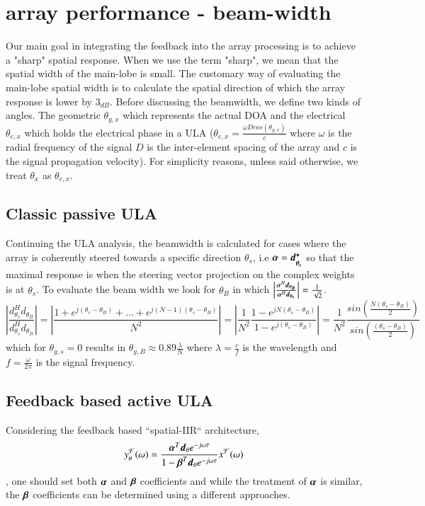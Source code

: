 \chapter{array performance - beam-width}
\label{apdx:arrayPerformance_beamwidth}
Our main goal in integrating the feedback into the array processing is to achieve a "sharp" spatial response. When we use the term "sharp", we mean that the spatial width of the main-lobe is small. The customary way of evaluating the main-lobe spatial width is to calculate the spatial direction of which the array response is lower by $3_{dB}$.
Before discussing the beamwidth, we define two kinds of angles. The geometric $\theta_{g,x}$ which represents the actual DOA and the electrical $\theta_{e,x}$ which holds the electrical phase in a ULA ($\theta_{e,x} = \frac{\omega{Dcos(\theta_{g,x})}}{c}$ where $\omega$ is the radial frequency of the signal $D$ is the inter-element spacing of the array and $c$ is the signal propagation velocity). For simplicity reasons, unless said otherwise, we treat $\theta_{x}$ as $\theta_{e,x}$. 
\section{Classic passive ULA}
Continuing the ULA analysis, the beamwidth is calculated for cases where the array is coherently steered towards a specific direction $\theta_{s}$, i.e $ \boldsymbol{\alpha} = \boldsymbol{d^{*}_{\theta_{s}}}$ so that the maximal response is when the steering vector projection on the complex weights is at $\theta_{s}$.
To evaluate the beam width we look for $\theta_{B}$ in which 
$ \left|\frac{
\boldsymbol{\alpha}^{H}\boldsymbol{d_{\theta_{B}}}
}{
\boldsymbol{\alpha}^{H}\boldsymbol{d_{\theta_{s}}}
}\right| = \frac{1}{\sqrt{2}}$.
$$
\left|\frac{
d^{H}_{\theta_{s}}d_{\theta_{B}}
}{
d^{H}_{\theta_{s}}d_{\theta_{B}}
}\right|
=
\left|
\frac{1+e^{j(\theta_{s}-\theta_{B})}+\hdots+e^{j(N-1)(\theta_{s}-\theta_{B})}
}{
N^2
}
\right|
=
\left|
\frac{1}{N^2}\frac{
1-e^{jN(\theta_{s}-\theta_{B})}
}{
1-e^{j(\theta_{s}-\theta_{B})}
}
\right|
=
\frac{1}{N^{2}}
\frac{
sin\left(\frac{N\left(\theta_{s}-\theta_{B}\right)}{2}\right)
}{
sin\left(\frac{\left(\theta_{s}-\theta_{B}\right)}{2}\right)
}
$$
which for $\theta_{g,s} = 0$ results in $\theta_{g,B} \approx 0.89\frac{\lambda}{N}$ where $\lambda = \frac{c}{f}$ is the wavelength and $f = \frac{\omega}{2\pi}$ is the signal frequency.
\section{Feedback based active ULA}
Considering the feedback based ``spatial-IIR`` architecture, 
$$ 
y_{\theta}^{\mathcal{F}}(\omega) 
=
\frac
{
\boldsymbol{\alpha}^{T}
\boldsymbol{d}_{\theta}
e^{-j\omega\tau}
}
{
1
-
\boldsymbol{\beta}^{T}\boldsymbol{d}_{\theta}
e^{-j\omega\tau}
}
x^{\mathcal{F}}(\omega)
$$,
one should set both $\boldsymbol{\alpha}$ and $\boldsymbol{\beta}$ coefficients and while the treatment of $\boldsymbol{\alpha}$ is similar, the $\boldsymbol{\beta}$ coefficients can be determined using a different approaches. 
